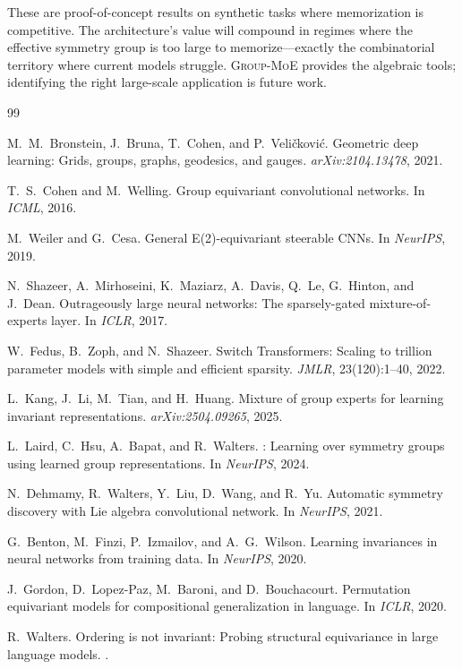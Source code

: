 \documentclass[10pt, letterpaper]{article}
\newcommand{\gmoe}{\textsc{Group-MoE}}
\begin{document}
These are proof-of-concept results on synthetic tasks where memorization is competitive. The architecture's value will compound in regimes where the effective symmetry group is too large to memorize---exactly the combinatorial territory where current models struggle. \gmoe{} provides the algebraic tools; identifying the right large-scale application is future work.

\begin{thebibliography}{99}

M.~M.~Bronstein, J.~Bruna, T.~Cohen, and P.~Veli\v{c}kovi\'{c}.
\newblock Geometric deep learning: Grids, groups, graphs, geodesics, and gauges.
\newblock \emph{arXiv:2104.13478}, 2021.

T.~S.~Cohen and M.~Welling.
\newblock Group equivariant convolutional networks.
\newblock In \emph{ICML}, 2016.

M.~Weiler and G.~Cesa.
\newblock General {E(2)}-equivariant steerable {CNNs}.
\newblock In \emph{NeurIPS}, 2019.

N.~Shazeer, A.~Mirhoseini, K.~Maziarz, A.~Davis, Q.~Le, G.~Hinton, and J.~Dean.
\newblock Outrageously large neural networks: The sparsely-gated mixture-of-experts layer.
\newblock In \emph{ICLR}, 2017.

W.~Fedus, B.~Zoph, and N.~Shazeer.
\newblock Switch {T}ransformers: Scaling to trillion parameter models with simple and efficient sparsity.
\newblock \emph{JMLR}, 23(120):1--40, 2022.

L.~Kang, J.~Li, M.~Tian, and H.~Huang.
\newblock Mixture of group experts for learning invariant representations.
\newblock \emph{arXiv:2504.09265}, 2025.

L.~Laird, C.~Hsu, A.~Bapat, and R.~Walters.
: Learning over symmetry groups using learned group representations.
\newblock In \emph{NeurIPS}, 2024.

N.~Dehmamy, R.~Walters, Y.~Liu, D.~Wang, and R.~Yu.
\newblock Automatic symmetry discovery with {L}ie algebra convolutional network.
\newblock In \emph{NeurIPS}, 2021.

G.~Benton, M.~Finzi, P.~Izmailov, and A.~G.~Wilson.
\newblock Learning invariances in neural networks from training data.
\newblock In \emph{NeurIPS}, 2020.

J.~Gordon, D.~Lopez-Paz, M.~Baroni, and D.~Bouchacourt.
\newblock Permutation equivariant models for compositional generalization in language.
\newblock In \emph{ICLR}, 2020.

R.~Walters.
\newblock Ordering is not invariant: Probing structural equivariance in large language models.
.

\end{thebibliography}
\end{document}
